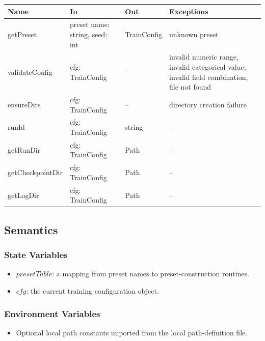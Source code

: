 \documentclass[12pt, titlepage]{article}
\begin{document}
\begin{center}
\begin{tabular}{p{3.4cm} p{4.8cm} p{4.0cm} p{3.0cm}}
\hline
\textbf{Name} & \textbf{In} & \textbf{Out} & \textbf{Exceptions} \\
\hline
getPreset &
preset name: string, seed: int &
TrainConfig &
unknown preset \\

validateConfig &
cfg: TrainConfig &
-- &
invalid numeric range, invalid categorical value, invalid field combination, file not found \\

ensureDirs &
cfg: TrainConfig &
-- &
directory creation failure \\

runId &
cfg: TrainConfig &
string &
-- \\

getRunDir &
cfg: TrainConfig &
Path &
-- \\

getCheckpointDir &
cfg: TrainConfig &
Path &
-- \\

getLogDir &
cfg: TrainConfig &
Path &
-- \\
\hline
\end{tabular}
\end{center}

\subsection{Semantics}

\subsubsection{State Variables}

\begin{itemize}
    \item $presetTable$: a mapping from preset names to preset-construction routines.
    \item $cfg$: the current training configuration object.
\end{itemize}

\subsubsection{Environment Variables}

\begin{itemize}
    \item Optional local path constants imported from the local path-definition file.
\end{itemize}
\end{document}
